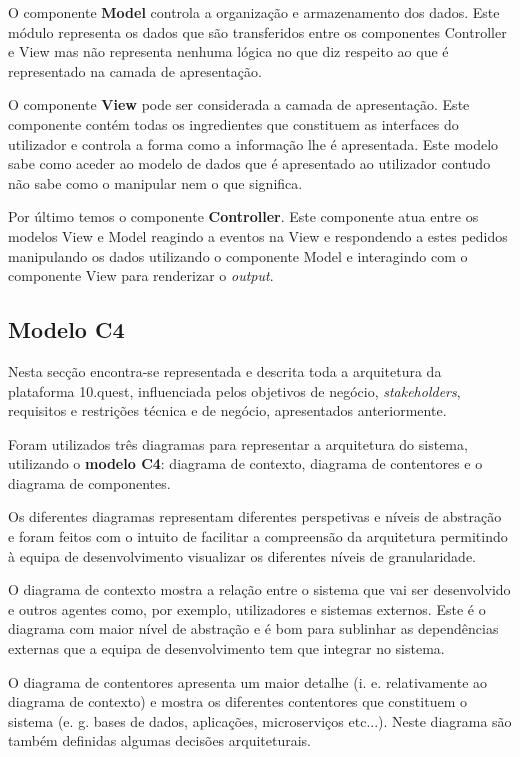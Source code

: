 O componente \textbf{Model} controla a organização e armazenamento dos dados. Este módulo representa os dados que são transferidos entre os componentes Controller e View mas não representa nenhuma lógica no que diz respeito ao que é representado na camada de apresentação.

O componente \textbf{View} pode ser considerada a camada de apresentação. Este componente contém todas os ingredientes que constituem as interfaces do utilizador e controla a forma como a informação lhe é apresentada. Este modelo sabe como aceder ao modelo de dados que é apresentado ao utilizador contudo não sabe como o manipular nem o que significa.

Por último temos o componente \textbf{Controller}.  Este componente atua entre os modelos View e Model reagindo a eventos na View e respondendo a estes pedidos manipulando os dados utilizando o componente Model e interagindo com o componente View para renderizar o \textit{output}.


\subsection{Modelo C4}

Nesta secção encontra-se representada e descrita toda a arquitetura da plataforma 10.quest,  influenciada pelos objetivos de negócio, \textit{stakeholders}, requisitos e restrições técnica e de negócio, apresentados anteriormente.

Foram utilizados três diagramas para representar a arquitetura do sistema, utilizando o \textbf{modelo C4}\cite{c4}: diagrama de contexto, diagrama de contentores e o diagrama de componentes.

Os diferentes diagramas representam diferentes perspetivas e níveis de abstração e foram feitos com o intuito de facilitar a compreensão da arquitetura permitindo à equipa de desenvolvimento visualizar os diferentes níveis de granularidade. 

O diagrama de contexto mostra a relação entre o sistema que vai ser desenvolvido e outros agentes como, por exemplo, utilizadores e sistemas externos.  Este é o diagrama com maior nível de abstração e é bom para sublinhar as dependências externas que a equipa de desenvolvimento tem que integrar no sistema. 

O diagrama de contentores apresenta um maior detalhe (i. e. relativamente ao diagrama de contexto) e mostra os diferentes contentores que constituem o sistema (e. g. bases de dados, aplicações, microserviços etc...). Neste diagrama são também definidas algumas decisões arquiteturais. 

